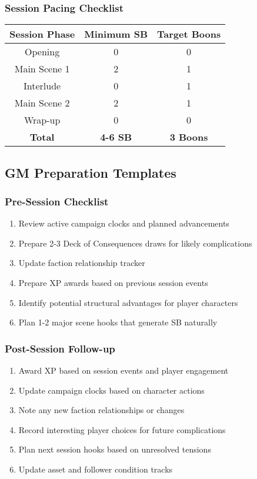 \documentclass[11pt,letterpaper]{article}
\begin{document}
\subsubsection{Session Pacing Checklist}

\begin{center}
\begin{tabular}{|c|c|c|}
\hline
\textbf{Session Phase} & \textbf{Minimum SB} & \textbf{Target Boons} \\
\hline
Opening & 0 & 0 \\
\hline
Main Scene 1 & 2 & 1 \\
\hline
Interlude & 0 & 1 \\
\hline
Main Scene 2 & 2 & 1 \\
\hline
Wrap-up & 0 & 0 \\
\hline
\textbf{Total} & \textbf{4-6 SB} & \textbf{3 Boons} \\
\hline
\end{tabular}
\end{center}

\subsection{GM Preparation Templates}

\subsubsection{Pre-Session Checklist}

\begin{enumerate}
    \item Review active campaign clocks and planned advancements
    \item Prepare 2-3 Deck of Consequences draws for likely complications
    \item Update faction relationship tracker
    \item Prepare XP awards based on previous session events
    \item Identify potential structural advantages for player characters
    \item Plan 1-2 major scene hooks that generate SB naturally
\end{enumerate}

\subsubsection{Post-Session Follow-up}

\begin{enumerate}
    \item Award XP based on session events and player engagement
    \item Update campaign clocks based on character actions
    \item Note any new faction relationships or changes
    \item Record interesting player choices for future complications
    \item Plan next session hooks based on unresolved tensions
    \item Update asset and follower condition tracks
\end{enumerate}
\end{document}
